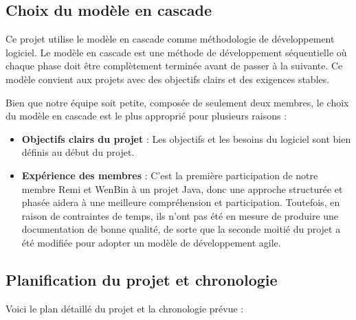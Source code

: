 \documentclass{article}
\begin{document}
\subsection{Choix du modèle en cascade}

Ce projet utilise le modèle en cascade comme méthodologie de développement logiciel. Le modèle en cascade est une méthode de développement séquentielle où chaque phase doit être complètement terminée avant de passer à la suivante. Ce modèle convient aux projets avec des objectifs clairs et des exigences stables.

Bien que notre équipe soit petite, composée de seulement deux membres, le choix du modèle en cascade est le plus approprié pour plusieurs raisons :
\begin{itemize}
    \item \textbf{Objectifs clairs du projet} : Les objectifs et les besoins du logiciel sont bien définis au début du projet.
    \item \textbf{Expérience des membres} : C'est la première participation de notre membre Remi et WenBin à un projet Java, donc une approche structurée et phasée aidera à une meilleure compréhension et participation. Toutefois, en raison de contraintes de temps, ils n'ont pas été en mesure de produire une documentation de bonne qualité, de sorte que la seconde moitié du projet a été modifiée pour adopter un modèle de développement agile.
\end{itemize}

\subsection{Planification du projet et chronologie}

Voici le plan détaillé du projet et la chronologie prévue :
\end{document}
